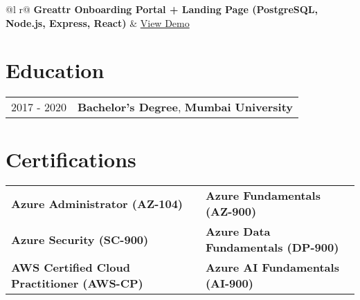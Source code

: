 \documentclass[a4paper,10pt]{article}  %
\begin{document}
\begin{tabularx}{\linewidth}{ @{}l r@{} }
\textbf{Greattr Onboarding Portal + Landing Page (PostgreSQL, Node.js, Express, React)} & \hfill \href{https://www.greattr.com}{View Demo} \\[3.75pt]
\end{tabularx}


\section{Education}
\begin{tabularx}{\linewidth}{@{}l X@{}}	
2017 - 2020 & \textbf{Bachelor's Degree}, \textbf{Mumbai University} \\ 
\end{tabularx}

\section{Certifications}
\begin{tabularx}{\linewidth}{@{}l X l@{}}
\textbf{Azure Administrator (AZ-104)} & & \textbf{Azure Fundamentals (AZ-900)} \\
\textbf{Azure Security (SC-900)} & & \textbf{Azure Data Fundamentals (DP-900)} \\
\textbf{AWS Certified Cloud Practitioner (AWS-CP)} & & \textbf{Azure AI Fundamentals (AI-900)} \\
\end{tabularx}
\end{document}
